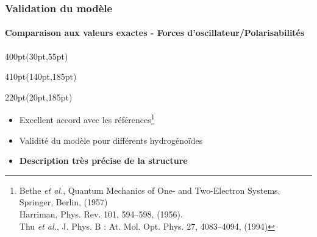 \begin{frame}
 \frametitle{Validation du mod\`ele}
 \framesubtitle{Comparaison aux valeurs exactes - Forces d'oscillateur/Polarisabilit\'es}

\begin{textblock*}{400pt}(30pt,55pt)
\begin{table}[p]
 \tiny\centering
 
\end{table}

\end{textblock*}


\begin{textblock*}{410pt}(140pt,185pt)
\begin{table}[p]
 \tiny\centering
 
\end{table}

\end{textblock*}


\begin{textblock*}{220pt}(20pt,185pt)
 \scriptsize
\begin{itemize}
 \item[$\bullet$] Excellent accord avec les r\'ef\'erences\footnote{
\Tiny
Bethe \textit{et al.}, Quantum Mechanics of One- and Two-Electron Systems.
Springer, Berlin, (1957) \\
\hspace{5.4mm}Harriman, Phys. Rev. 101, 594–598, (1956). \\
\hspace{5.4mm}Thu \textit{et al.}, J. Phys. B : At. Mol. Opt. Phys. 27, 4083–4094, (1994)}
 \item[$\bullet$] Validit\'e du mod\`ele pour diff\'erents hydrog\'eno\"ides 
 \item[$\bullet$] \textbf{Description tr\`es pr\'ecise de la structure}
\end{itemize}

\end{textblock*}





\end{frame}



